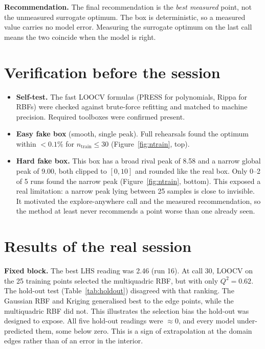 \documentclass[11pt,a4paper]{article}
\newcommand{\Qsq}{Q^2}
\begin{document}
\textbf{Recommendation.}
The final recommendation is the \emph{best measured} point, not the unmeasured surrogate optimum.
The box is deterministic, so a measured value carries no model error.
Measuring the surrogate optimum on the last call means the two coincide when the model is right.

\section{Verification before the session}
\label{sec:verify}
\begin{itemize}
\setlength{\itemsep}{0pt}
\item \textbf{Self-test.} The fast LOOCV formulas (PRESS for polynomials, Rippa for RBFs) were checked against brute-force refitting and matched to machine precision. Required toolboxes were confirmed present.
\item \textbf{Easy fake box} (smooth, single peak). Full rehearsals found the optimum within $<0.1\%$ for $n_\text{train}\le30$ (Figure~\ref{fig:ntrain}, top).
\item \textbf{Hard fake box.} This box has a broad rival peak of 8.58 and a narrow global peak of 9.00, both clipped to $[0,10]$ and rounded like the real box. Only 0--2 of 5 runs found the narrow peak (Figure~\ref{fig:ntrain}, bottom). This exposed a real limitation: a narrow peak lying between 25 samples is close to invisible. It motivated the explore-anywhere call and the measured recommendation, so the method at least never recommends a point worse than one already seen.
\end{itemize}

\section{Results of the real session}
\textbf{Fixed block.}
The best LHS reading was 2.46 (run 16).
At call 30, LOOCV on the 25 training points selected the multiquadric RBF, but with only $\Qsq=0.62$.
The hold-out test (Table~\ref{tab:holdout}) disagreed with that ranking.
The Gaussian RBF and Kriging generalised best to the edge points, while the multiquadric RBF did not.
This illustrates the selection bias the hold-out was designed to expose.
All five hold-out readings were $\approx0$, and every model under-predicted them, some below zero.
This is a sign of extrapolation at the domain edges rather than of an error in the interior.
\end{document}
